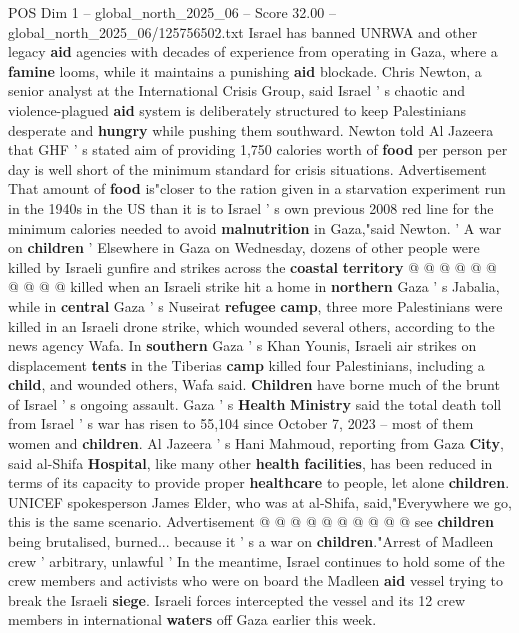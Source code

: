 \begin{textsample}{POS Dim 1 – global\_north\_2025\_06 – Score 32.00 – global\_north\_2025\_06/125756502.txt}
Israel has banned UNRWA and other legacy \textbf{aid} agencies with decades of experience from operating in Gaza, where a \textbf{famine} looms, while it maintains a punishing \textbf{aid} blockade.
Chris Newton, a senior analyst at the International Crisis Group, said Israel ' s chaotic and violence-plagued \textbf{aid} system is deliberately structured to keep Palestinians desperate and \textbf{hungry} while pushing them southward.
Newton told Al Jazeera that GHF ' s stated aim of providing 1,750 calories worth of \textbf{food} per person per day is well short of the minimum standard for crisis situations.
Advertisement That amount of \textbf{food} is"closer to the ration given in a starvation experiment run in the 1940s in the US than it is to Israel ' s own previous 2008 red line for the minimum calories needed to avoid \textbf{malnutrition} in Gaza,"said Newton. ' A war on \textbf{children} ' Elsewhere in Gaza on Wednesday, dozens of other people were killed by Israeli gunfire and strikes across the \textbf{coastal} \textbf{territory} @ @ @ @ @ @ @ @ @ @ killed when an Israeli strike hit a home in \textbf{northern} Gaza ' s Jabalia, while in \textbf{central} Gaza ' s Nuseirat \textbf{refugee} \textbf{camp}, three more Palestinians were killed in an Israeli drone strike, which wounded several others, according to the news agency Wafa.
In \textbf{southern} Gaza ' s Khan Younis, Israeli air strikes on displacement \textbf{tents} in the Tiberias \textbf{camp} killed four Palestinians, including a \textbf{child}, and wounded others, Wafa said. \textbf{Children} have borne much of the brunt of Israel ' s ongoing assault.
Gaza ' s \textbf{Health} \textbf{Ministry} said the total death toll from Israel ' s war has risen to 55,104 since October 7, 2023 -- most of them women and \textbf{children}.
Al Jazeera ' s Hani Mahmoud, reporting from Gaza \textbf{City}, said al-Shifa \textbf{Hospital}, like many other \textbf{health} \textbf{facilities}, has been reduced in terms of its capacity to provide proper \textbf{healthcare} to people, let alone \textbf{children}.
UNICEF spokesperson James Elder, who was at al-Shifa, said,"Everywhere we go, this is the same scenario.
Advertisement @ @ @ @ @ @ @ @ @ @ see \textbf{children} being brutalised, burned... because it ' s a war on \textbf{children}."Arrest of Madleen crew ' arbitrary, unlawful ' In the meantime, Israel continues to hold some of the crew members and activists who were on board the Madleen \textbf{aid} vessel trying to break the Israeli \textbf{siege}.
Israeli forces intercepted the vessel and its 12 crew members in international \textbf{waters} off Gaza earlier this week.

\end{textsample}
